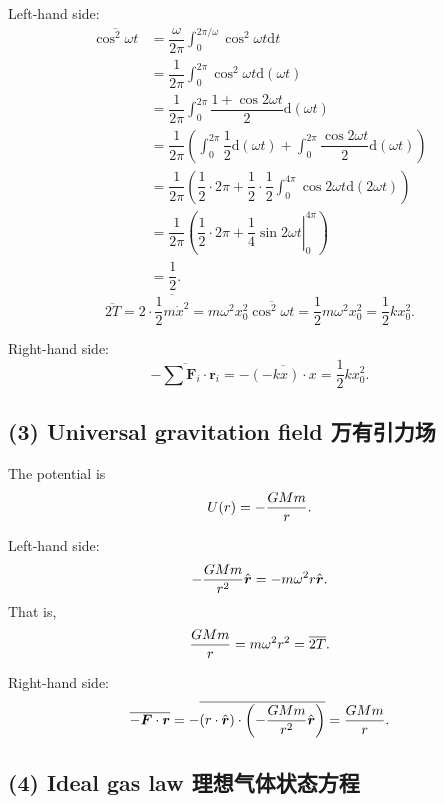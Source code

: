 Left-hand side: \begin{align*}
    \overline{\cos ^2 \omega t} & = \dfrac{\omega}{2 \pi} \int_0^{2 \pi/\omega}  \cos^2 \omega t \mathrm{d}t \\
    & = \dfrac{1}{2 \pi} \int_0^{2 \pi} \cos^2 \omega t \mathrm{d} (\omega t) \\
    & = \dfrac{1}{2 \pi} \int_0^{2 \pi} \dfrac{1 + \cos 2 \omega t}{2} \mathrm{d} (\omega t) \\
    & = \dfrac{1}{2 \pi} \left( \int_0^{2 \pi} \dfrac{1}{2} \mathrm{d} (\omega t) + \int_0^{2 \pi} \dfrac{\cos 2 \omega t}{2} \mathrm{d} (\omega t) \right) \\
    & = \dfrac{1}{2 \pi} \left( \dfrac{1}{2} \cdot 2 \pi + \dfrac{1}{2} \cdot \dfrac{1}{2} \int_0^{4 \pi} \cos 2 \omega t \mathrm{d} (2 \omega t) \right) \\
    & = \dfrac{1}{2 \pi} \left( \dfrac{1}{2} \cdot 2 \pi + \left. \dfrac{1}{4} \sin 2 \omega t \right|_{0}^{4 \pi} \right) \\
    & = \dfrac{1}{2}.
\end{align*}
\[\overline{2T} = 2 \cdot \overline{\dfrac{1}{2}m \dot x^2} = m \omega^2 x_0^2 \overline{\cos ^2 \omega t} = \dfrac{1}{2} m \omega^2 x_0^2 = \dfrac{1}{2} k x_0^2.\]

Right-hand side:
\[\overline{- \sum \boldsymbol{F}_i \cdot \boldsymbol{r}_i} = - \overline{(- kx) \cdot x} = \dfrac{1}{2} k x_0^2.\]

\subsection*{(3) Universal gravitation field
万有引力场}\label{universal-gravitation-field-ux4e07ux6709ux5f15ux529bux573a}

The potential is \[U(r) = - {GMm \over r}.\]

Left-hand side:
\[- {GMm \over r^2} \hat{\boldsymbol{r}} = - m \omega^2 r \hat{\boldsymbol{r}}.\]
That is, \[{GMm \over r} = m \omega^2 r^2 = \overline{2T}.\]

Right-hand side:
\[\overline{- \boldsymbol{F} \cdot \boldsymbol{r}} = - \overline{\left( r \cdot \hat{\boldsymbol{r}} \right) \cdot \left(- {GMm \over r^2} \hat{\boldsymbol{r}} \right)} = {GMm \over r}.\]

\subsection*{(4) Ideal gas law
理想气体状态方程}\label{ideal-gas-law-ux7406ux60f3ux6c14ux4f53ux72b6ux6001ux65b9ux7a0b}

